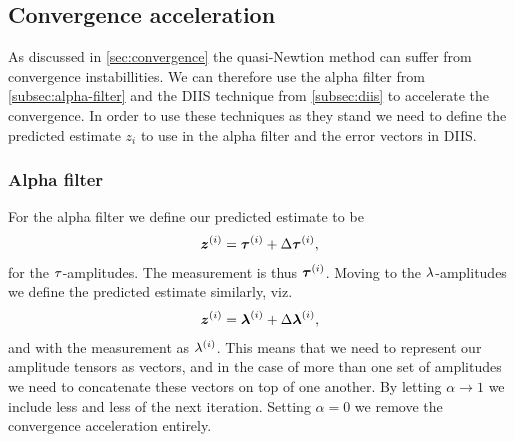         \subsection{Convergence acceleration}
            As discussed in \autoref{sec:convergence} the quasi-Newtion method
            can suffer from convergence instabillities.
            We can therefore use the alpha filter from
            \autoref{subsec:alpha-filter} and the DIIS technique from
            \autoref{subsec:diis} to accelerate the convergence.
            In order to use these techniques as they stand we need to define the
            predicted estimate $z_i$ to use in the alpha filter and the error
            vectors in DIIS.

            \subsubsection{Alpha filter}
                For the alpha filter we define our predicted estimate to be
                \begin{align}
                    \boldsymbol{z}^{(i)} = \boldsymbol{\tau}^{(i)}
                    + \Delta\boldsymbol{\tau}^{(i)},
                \end{align}
                for the $\tau$-amplitudes.
                The measurement is thus $\boldsymbol{\tau}^{(i)}$.
                Moving to the $\lambda$-amplitudes we define the predicted
                estimate similarly, viz.
                \begin{align}
                    \boldsymbol{z}^{(i)} = \boldsymbol{\lambda}^{(i)}
                    + \Delta\boldsymbol{\lambda}^{(i)},
                \end{align}
                and with the measurement as $\lambda^{(i)}$.
                This means that we need to represent our amplitude tensors as
                vectors, and in the case of more than one set of amplitudes we
                need to concatenate these vectors on top of one another.
                By letting $\alpha \to 1$ we include less and less of the next
                iteration.
                Setting $\alpha = 0$ we remove the convergence acceleration
                entirely.

